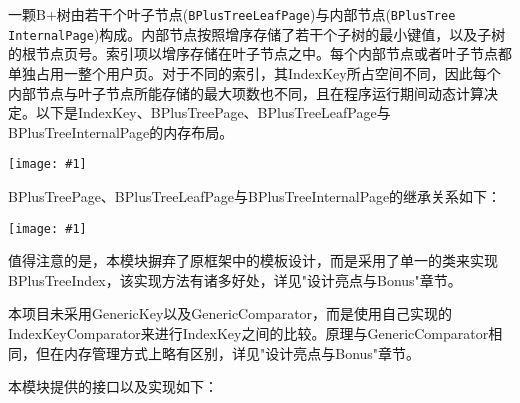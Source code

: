 \documentclass[12pt, a4paper]{article}
\def\c#1{\texttt{#1}}
\def\p{\par}
\def\g#1{\begin{center}\texttt{[image: \#1]}\end{center}}
\begin{document}
\p 一颗B+树由若干个叶子节点(\c{BPlusTreeLeafPage})与内部节点(\c{BPlusTree InternalPage})构成。内部节点按照增序存储了若干个子树的最小键值，以及子树的根节点页号。索引项以增序存储在叶子节点之中。每个内部节点或者叶子节点都单独占用一整个用户页。对于不同的索引，其IndexKey所占空间不同，因此每个内部节点与叶子节点所能存储的最大项数也不同，且在程序运行期间动态计算决定。以下是IndexKey、BPlusTreePage、BPlusTreeLeafPage与BPlusTreeInternalPage的内存布局。
\g{b_plus_tree_pages.pdf}
BPlusTreePage、BPlusTreeLeafPage与BPlusTreeInternalPage的继承关系如下：
\g{b_plus_tree_page_inherit.pdf}
\p 值得注意的是，本模块摒弃了原框架中的模板设计，而是采用了单一的类来实现BPlusTreeIndex，该实现方法有诸多好处，详见"设计亮点与Bonus"章节。
\p 本项目未采用GenericKey以及GenericComparator，而是使用自己实现的IndexKeyComparator来进行IndexKey之间的比较。原理与GenericComparator相同，但在内存管理方式上略有区别，详见"设计亮点与Bonus"章节。
\p 本模块提供的接口以及实现如下：
\end{document}
